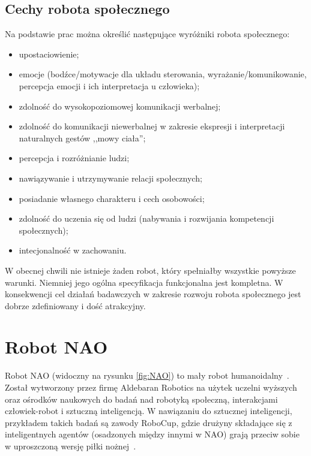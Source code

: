 \subsection{Cechy robota społecznego}
\label{subsec:robspol}

Na podstawie prac \cite{AREN, FONG} można określić następujące wyróżniki robota społecznego:
\begin{itemize}
    \setlength\itemsep{-0.4em}
    \item upostaciowienie;
    \item emocje (bodźce/motywacje dla układu sterowania, wyrażanie/komunikowanie, percepcja emocji i ich interpretacja u człowieka);
    \item zdolność do wysokopoziomowej komunikacji werbalnej; 
    \item zdolność do komunikacji niewerbalnej w zakresie ekspresji i interpretacji naturalnych gestów ,,mowy ciała'';
    \item percepcja i rozróżnianie ludzi; %
    \item nawiązywanie i utrzymywanie relacji społecznych;
    \item posiadanie własnego charakteru i cech osobowości;
    \item zdolność do uczenia się od ludzi (nabywania i rozwijania kompetencji społecznych);
    \item intecjonalność w zachowaniu.
\end{itemize}

W obecnej chwili nie istnieje żaden robot, który spełniałby wszystkie powyższe warunki. Niemniej jego ogólna specyfikacja funkcjonalna jest kompletna. W konsekwencji cel działań badawczych w zakresie rozwoju robota społecznego jest dobrze zdefiniowany i dość atrakcyjny.


\section{Robot NAO}
\label{sec:NAO}

Robot NAO (widoczny na rysunku \ref{fig:NAO}) to mały robot humanoidalny~\cite{NAOsite}. Został wytworzony przez firmę Aldebaran Robotics na użytek uczelni wyższych oraz ośrodków naukowych do badań nad robotyką społeczną, interakcjami człowiek-robot i sztuczną inteligencją. W nawiązaniu do sztucznej inteligencji, przykładem takich badań są zawody RoboCup, gdzie drużyny składające się z inteligentnych agentów (osadzonych między innymi w NAO) grają przeciw sobie w uproszczoną wersję piłki nożnej~\cite{NAOcup}. 

